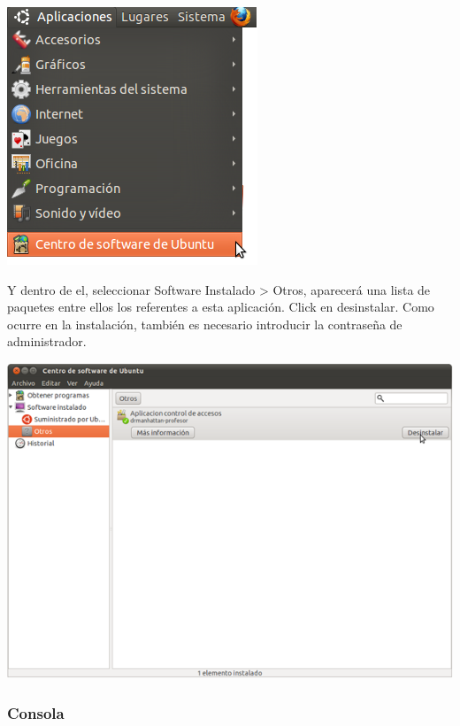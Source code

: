\documentclass[a4paper,11pt]{article}
\begin{document}
\begin{center}

    \includegraphics{imagenes/localLizacionCentroSoftware}

\end{center}

Y dentro de el, seleccionar Software Instalado > Otros, aparecerá una lista de paquetes entre ellos los referentes a esta aplicación. Click en desinstalar. Como ocurre en la instalación, también es necesario introducir la contraseña de administrador.

\begin{center}

    \includegraphics[width=.90\linewidth]{imagenes/desinstalar}

\end{center}

\subsubsection{Consola}
\end{document}
